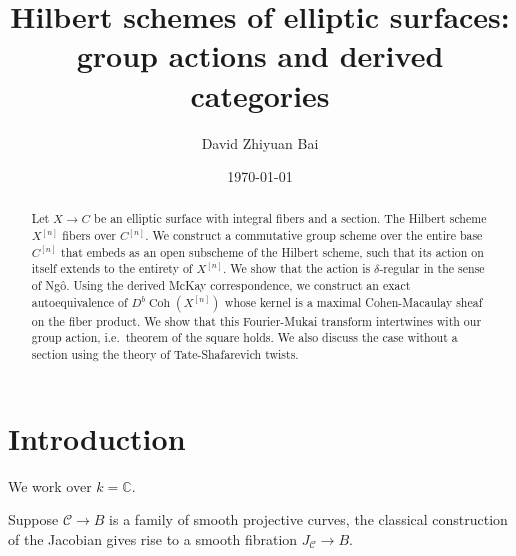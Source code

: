 \documentclass{amsart}
\title[Hilbert schemes of elliptic surfaces]{Hilbert schemes of elliptic surfaces: group actions and derived categories}
\author{David Zhiyuan Bai}
\date{\today}
\theoremstyle{plain}
\theoremstyle{definition}
\theoremstyle{remark}
\begin{document}
\begin{abstract}
    Let $X\to C$ be an elliptic surface with integral fibers and a section.
    The Hilbert scheme $X^{[n]}$ fibers over $C^{[n]}$.
    We construct a commutative group scheme over the entire base $C^{[n]}$ that embeds as an open subscheme of the Hilbert scheme, such that its action on itself extends to the entirety of $X^{[n]}$.
    We show that the action is $\delta$-regular in the sense of Ng\^o.
    Using the derived McKay correspondence, we construct an exact autoequivalence of $D^b\operatorname{Coh}(X^{[n]})$ whose kernel is a maximal Cohen-Macaulay sheaf on the fiber product.
    We show that this Fourier-Mukai transform intertwines with our group action, i.e.~theorem of the square holds.
    We also discuss the case without a section using the theory of Tate-Shafarevich twists.
\end{abstract}
    \maketitle
    \tableofcontents
    \section{Introduction}
    We work over $k=\mathbb C$.

    Suppose $\mathcal C\to B$ is a family of smooth projective curves, the classical construction of the Jacobian gives rise to a smooth fibration $J_{\mathcal C}\to B$.
\end{document}
